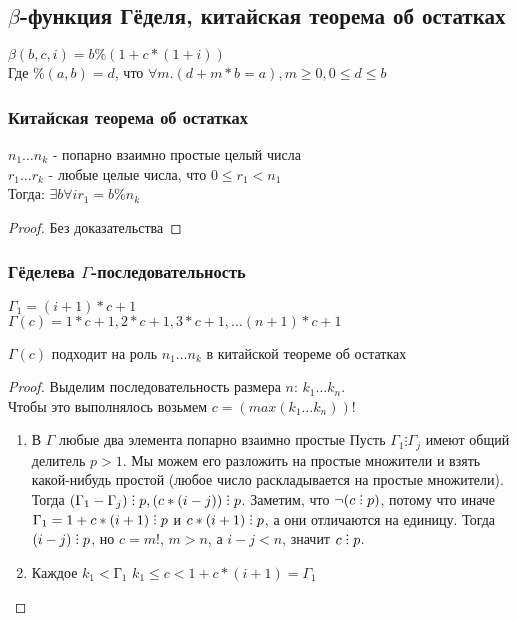 \subsection{\texorpdfstring{$\beta$}{Бета}-функция Гёделя, китайская теорема об остатках}
\label{sec-11-3}
$\beta(b, c, i) = b \% (1 + c * (1 + i))$\\
Где $\%(a, b) = d$, что $\forall m . (d + m * b = a), m \geq 0, 0 \leq d \leq b$

\subsubsection{Китайская теорема об остатках}
\label{sec-11-3-1}
\begin{theorem}
$n_1\dots n_k$ - попарно взаимно простые целый числа\\
$r_1\dots r_k$ - любые целые числа, что $0 \leq r_1 < n_1$\\
Тогда: $\exists b \forall i  r_1 = b \% n_k$
\end{theorem}
\begin{proof}
Без доказательства
\end{proof}

\subsubsection{Гёделева \texorpdfstring{$\Gamma$}{Г}-последовательность}
\label{sec-11-3-2}
$\Gamma_1 = (i + 1) * c + 1$\\
$\Gamma(c) = 1 * c + 1, 2 * c + 1, 3 * c + 1, \ldots (n + 1) * c + 1$
\begin{theorem}
$\Gamma(c)$ подходит на роль $n_1 \ldots n_k$ в китайской теореме об остатках
\end{theorem}
\begin{proof}
Выделим последовательность размера $n$: $k_1 \ldots k_n$.\\
Чтобы это выполнялось возьмем $c = (max(k_1\dots k_n))!$
\begin{enumerate}
\item В $\Gamma$ любые два элемента попарно взаимно простые
\label{sec-11-3-2-1}
Пусть $\Gamma_1 \vdots \Gamma_j$ имеют общий делитель $p > 1$. Мы можем его разложить на простые множители и взять какой-нибудь простой (любое число раскладывается на простые множители).\\
Тогда $(\Gamma_1 - \Gamma_j) \divby p, (c * (i - j)) \divby p$. Заметим, что $\lnot (c \divby p)$, потому что иначе $\Gamma_1 = 1 + c * (i + 1) \divby p$ и $c * (i + 1) \divby p$, а они отличаются на единицу. Тогда $(i - j) \divby p$, но $c = m!$, $m > n$, а $i - j < n$, значит $c \divby p$.
\item Каждое $k_1 < Г_1$
\label{sec-11-3-2-2}
$k_1 \leq c < 1 + c * (i + 1) = \Gamma_1$
\end{enumerate}
\end{proof}
